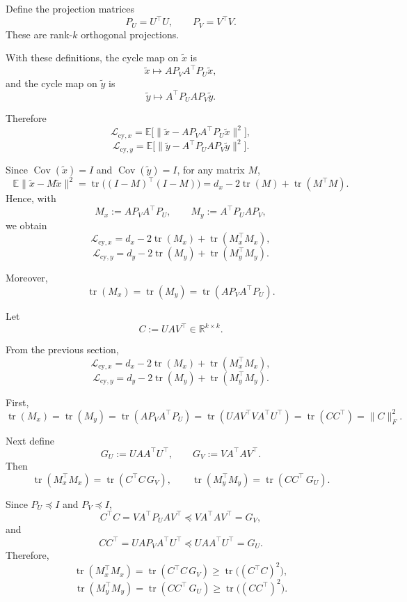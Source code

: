 \documentclass{article}
\begin{document}
Define the projection matrices
\[
P_U = U^\top U,
\qquad
P_V = V^\top V.
\]
These are rank-\(k\) orthogonal projections.

With these definitions, the cycle map on \(\tilde x\) is
\[
\tilde x \mapsto A P_V A^\top P_U \tilde x,
\]
and the cycle map on \(\tilde y\) is
\[
\tilde y \mapsto A^\top P_U A P_V \tilde y.
\]

Therefore
\[
\mathcal{L}_{\mathrm{cy},x}
=
\mathbb{E}\bigl[
\|\tilde x - A P_V A^\top P_U \tilde x\|^2
\bigr],
\]
\[
\mathcal{L}_{\mathrm{cy},y}
=
\mathbb{E}\bigl[
\|\tilde y - A^\top P_U A P_V \tilde y\|^2
\bigr].
\]

Since \(\operatorname{Cov}(\tilde x)=I\) and \(\operatorname{Cov}(\tilde y)=I\), for any matrix \(M\),
\[
\mathbb E\| \tilde x - M \tilde x\|^2
=
\operatorname{tr}\bigl((I-M)^\top(I-M)\bigr)
=
d_x - 2\operatorname{tr}(M) + \operatorname{tr}(M^\top M).
\]
Hence, with
\[
M_x := A P_V A^\top P_U,
\qquad
M_y := A^\top P_U A P_V,
\]
we obtain
\[
\mathcal{L}_{\mathrm{cy},x}
=
d_x
-2 \operatorname{tr}(M_x)
+
\operatorname{tr}(M_x^\top M_x),
\]
\[
\mathcal{L}_{\mathrm{cy},y}
=
d_y
-2 \operatorname{tr}(M_y)
+
\operatorname{tr}(M_y^\top M_y).
\]

Moreover,
\[
\operatorname{tr}(M_x)=\operatorname{tr}(M_y)=\operatorname{tr}(A P_V A^\top P_U).
\]

Let
\[
C := U A V^\top \in \mathbb{R}^{k\times k}.
\]


From the previous section,
\[
\mathcal{L}_{\mathrm{cy},x}
=
d_x - 2\operatorname{tr}(M_x) + \operatorname{tr}(M_x^\top M_x),
\]
\[
\mathcal{L}_{\mathrm{cy},y}
=
d_y - 2\operatorname{tr}(M_y) + \operatorname{tr}(M_y^\top M_y).
\]

First,
\[
\operatorname{tr}(M_x)=\operatorname{tr}(M_y)
=\operatorname{tr}(A P_V A^\top P_U)
=\operatorname{tr}(U A V^\top V A^\top U^\top)
=\operatorname{tr}(C C^\top)
=\|C\|_F^2.
\]

Next define
\[
G_U := U A A^\top U^\top,
\qquad
G_V := V A^\top A V^\top.
\]
Then
\[
\operatorname{tr}(M_x^\top M_x)
=
\operatorname{tr}(C^\top C\, G_V),
\qquad
\operatorname{tr}(M_y^\top M_y)
=
\operatorname{tr}(C C^\top\, G_U).
\]

Since \(P_U \preceq I\) and \(P_V \preceq I\),
\[
C^\top C
=
V A^\top P_U A V^\top
\preceq
V A^\top A V^\top
=
G_V,
\]
and
\[
C C^\top
=
U A P_V A^\top U^\top
\preceq
U A A^\top U^\top
=
G_U.
\]
Therefore,
\[
\operatorname{tr}(M_x^\top M_x)
=
\operatorname{tr}(C^\top C\, G_V)
\ge
\operatorname{tr}\bigl((C^\top C)^2\bigr),
\]
\[
\operatorname{tr}(M_y^\top M_y)
=
\operatorname{tr}(C C^\top\, G_U)
\ge
\operatorname{tr}\bigl((C C^\top)^2\bigr).
\]
\end{document}
